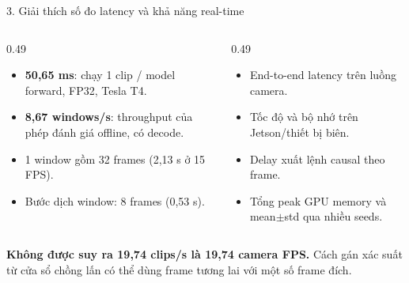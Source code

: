 \documentclass[aspectratio=169,9pt]{beamer}
\newcommand{\smallnote}[1]{{\fontsize{7.1}{8.4}\selectfont #1\par}}
\newcommand{\tightitems}{\setlength{\itemsep}{0.13em}\setlength{\parskip}{0pt}\setlength{\parsep}{0pt}}
\begin{document}
\begin{frame}{3. Giải thích số đo latency và khả năng real-time}
\begin{columns}[T,onlytextwidth]
\begin{column}{0.49\textwidth}
\begin{tcolorbox}[titlepanel,title=Những gì đã đo,height=4.5cm]
\begin{itemize}\tightitems
\item \textbf{50,65 ms}: chạy 1 clip / model forward, FP32, Tesla T4.
\item \textbf{8,67 windows/s}: throughput của phép đánh giá offline, có decode.
\item 1 window gồm 32 frames (2,13 s ở 15 FPS).
\item Bước dịch window: 8 frames (0,53 s).
\end{itemize}
\end{tcolorbox}
\end{column}
\begin{column}{0.49\textwidth}
\begin{tcolorbox}[titlepanel,title=Những gì chưa đo,height=4.5cm]
\begin{itemize}\tightitems
\item End-to-end latency trên luồng camera.
\item Tốc độ và bộ nhớ trên Jetson/thiết bị biên.
\item Delay xuất lệnh causal theo frame.
\item Tổng peak GPU memory và mean$\pm$std qua nhiều seeds.
\end{itemize}
\end{tcolorbox}
\end{column}
\end{columns}
\vspace{0.10cm}
\begin{tcolorbox}[keypanel]\centering
\smallnote{\textbf{Không được suy ra 19,74 clips/s là 19,74 camera FPS.} Cách gán xác suất từ cửa sổ chồng lấn có thể dùng frame tương lai với một số frame đích.}
\end{tcolorbox}
\end{frame}
\end{document}
